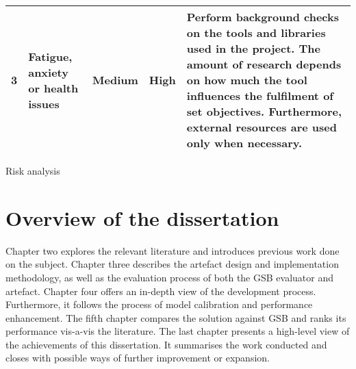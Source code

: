 \begin{singlespace}
\begin{center}
\begin{tabular}{ | m{0.5em} | m{7em} | m{5em} | m{3.2em}| m{17.5em} | }
			\textbf{3}  &
			Fatigue, anxiety or health issues
			            &
			Medium
			            &
			High
			            &
			Perform background checks on the tools and libraries used in the project. The amount of research depends on how much the tool influences the fulfilment of set objectives. Furthermore, external resources are used only when necessary. \\
			\hline
		\end{tabular}
		\captionsetup{type=table}\caption{Risk analysis}
	\end{center}
\end{singlespace}

\section{Overview of the dissertation}
\label{sec:overview_of_the_dissertation}
Chapter two explores the relevant literature and introduces previous work done on the subject. Chapter three describes the artefact design and implementation methodology, as well as the evaluation process of both the GSB evaluator and artefact. Chapter four offers an in-depth view of the development process. Furthermore, it follows the process of model calibration and performance enhancement. The fifth chapter compares the solution against GSB and ranks its performance vis-a-vis the literature. The last chapter presents a high-level view of the achievements of this dissertation. It summarises the work conducted and closes with possible ways of further improvement or expansion.